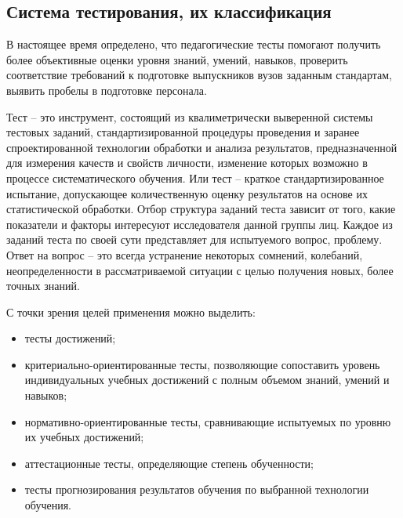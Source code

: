 \subsection{Система тестирования, их классификация}

В настоящее время определено, что педагогические тесты помогают
получить более объективные оценки уровня знаний, умений, навыков,
проверить соответствие требований к подготовке выпускников вузов заданным
стандартам, выявить пробелы в подготовке персонала.

Тест – это инструмент, состоящий из квалиметрически выверенной системы тестовых заданий, стандартизированной процедуры проведения и заранее спроектированной технологии обработки и анализа результатов, предназначенной для измерения качеств и свойств личности, изменение которых возможно в процессе систематического обучения. Или тест – краткое стандартизированное испытание, допускающее количественную оценку результатов на основе их
статистической обработки. Отбор структура заданий теста зависит от того, какие показатели и факторы интересуют исследователя данной группы лиц. Каждое из заданий теста по своей сути представляет для испытуемого вопрос, проблему. Ответ на вопрос – это всегда устранение некоторых сомнений, колебаний, неопределенности в рассматриваемой ситуации с целью получения новых, более точных знаний.

С точки зрения целей применения можно выделить:

\begin{itemize}
	\item тесты достижений;
	\item критериально-ориентированные тесты, позволяющие сопоставить
	уровень индивидуальных учебных достижений с полным объемом знаний,
	умений и навыков;
	\item нормативно-ориентированные тесты, сравнивающие испытуемых по
	уровню их учебных достижений;
	\item аттестационные тесты, определяющие степень обученности;
	\item тесты прогнозирования результатов обучения по выбранной
	технологии обучения.
\end{itemize}